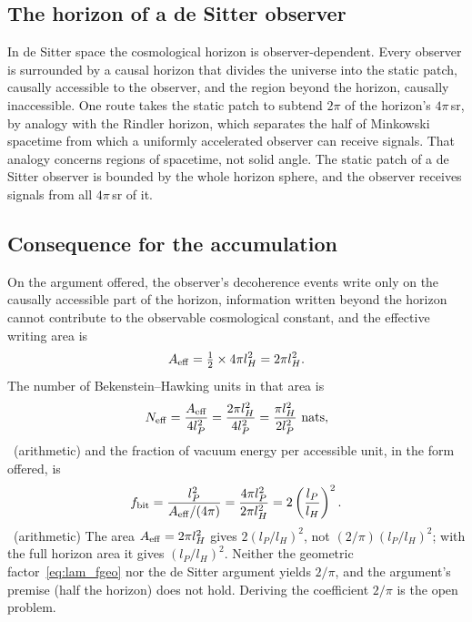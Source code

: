 \subsection{The horizon of a de Sitter observer}
In de Sitter space the cosmological horizon is observer-dependent. Every observer is surrounded by a causal horizon that divides the
universe into the static patch, causally accessible to the observer, and the region beyond the horizon, causally inaccessible. One
route takes the static patch to subtend $2\pi$ of the horizon's $4\pi$\,sr, by analogy with the Rindler horizon, which
separates the half of Minkowski spacetime from which a uniformly accelerated observer can receive signals. That analogy concerns
regions of spacetime, not solid angle. The static patch of a de Sitter observer is bounded by the whole horizon sphere, and the
observer receives signals from all $4\pi$\,sr of it. \derived

\subsection{Consequence for the accumulation}
On the argument offered, the observer's decoherence events write only on the causally accessible part of the horizon, information
written beyond the horizon cannot contribute to the observable cosmological constant, and the effective writing area is
\begin{equation}A_{\rm eff}=\tfrac12\times4\pi l_H^2=2\pi l_H^2 .\label{eq:lam_aeff}\end{equation}
The number of Bekenstein--Hawking units in that area is
\begin{equation}N_{\rm eff}=\frac{A_{\rm eff}}{4l_P^2}=\frac{2\pi l_H^2}{4l_P^2}=\frac{\pi l_H^2}{2l_P^2}\ \text{nats},\label{eq:lam_nbits}\end{equation}
\derived\ (arithmetic) and the fraction of vacuum energy per accessible unit, in the form offered, is
\begin{equation}f_{\rm bit}=\frac{l_P^2}{A_{\rm eff}/(4\pi)}=\frac{4\pi l_P^2}{2\pi l_H^2}=2\left(\frac{l_P}{l_H}\right)^2 .\label{eq:lam_fbit}\end{equation}
\derived\ (arithmetic) The area $A_{\rm eff}=2\pi l_H^2$ gives $2(l_P/l_H)^2$, not $(2/\pi)(l_P/l_H)^2$; with the full horizon area it
gives $(l_P/l_H)^2$. Neither the geometric factor~\eqref{eq:lam_fgeo} nor the de Sitter argument yields $2/\pi$, and the argument's premise (half the horizon) does not hold. Deriving the coefficient $2/\pi$ is the open problem. \openprob

